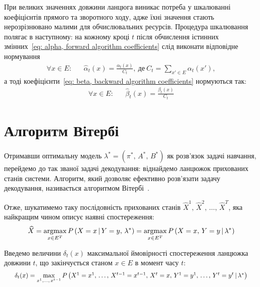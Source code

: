 \newpage
\begin{remark}
    При великих значеннях довжини ланцюга виникає потреба у шкалюванні~\cite[розділ 5]{Nilsson2005} коефіцієнтів прямого та зворотного ходу, адже їхні значення стають нерозрізнювано малими для обчислювальних ресурсів. Процедура шкалювання полягає в наступному: на кожному кроці $t$ після обчислення істинних змінних~\eqref{eq: alpha, forward algorithm coefficients} слід виконати відповідне нормування
    \begin{align*}
        \forall x \in E: && \widehat{\alpha}_t(x) = \frac{\alpha_t(x)}{C_t},\ \text{де}\ C_t = \sum\limits_{x' \in E}\alpha_t(x'),
    \end{align*}
    а тоді коефіцієнти~\eqref{eq: beta, backward algorithm coefficients} нормуються так:
    \begin{align*}
        \forall x \in E: && \widehat{\beta}_t(x) = \frac{\beta_t(x)}{C_t}
    \end{align*}
\end{remark}

\section{Алгоритм Вітербі}

Отримавши оптимальну модель $\lambda^*=(\pi^*,\,A^*,\,B^*)$ як розв'язок задачі навчання, перейдемо до так званої задачі декодування: віднайдемо ланцюжок прихованих станів системи. Алгоритм, який дозволяє ефективно розв’язати задачу декодування, називається алгоритмом Вітербі~\cite[розділ 6]{Nilsson2005}.

Отже, шукатимемо таку послідовність прихованих станів $\widehat{X}^1,\,\widehat{X}^2,\,\ldots,\,\widehat{X}^T$, яка найкращим чином описує наявні спостереження:
\begin{equation*}
    \widehat{X} = \operatorname*{argmax}\limits_{x \in E^T} P\left( X=x \,|\, Y=y,\, \lambda^* \right) = \operatorname*{argmax}\limits_{x \in E^T} P\left( X=x,\, Y=y \,|\, \lambda^* \right)
\end{equation*}

Введемо величини $\delta_t(x)$ максимальної ймовірності спостереження ланцюжка довжини $t$, що закінчується станом $x \in E$ в момент часу $t:$
\begin{equation*}\scaleq[0.9]{
    \delta_t(x)=\max\limits_{x^1,\ldots,\,x^{t-1}}P\left( X^1=x^1,\,\ldots,\,X^{t-1}=x^{t-1},\,X^t=x,\,Y^1=y^1,\,\ldots,\,Y^t=y^t \,|\, \lambda^*  \right)}
\end{equation*}

